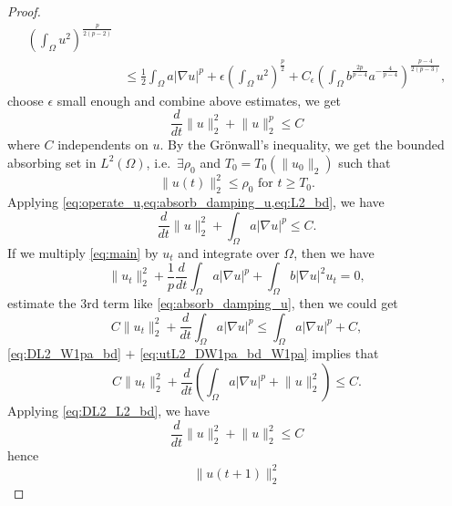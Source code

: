 \documentclass[11pt]{amsart}
\theoremstyle{definition}
\numberwithin{equation}{section}
\newcommand*\abs[1]{\lvert#1\rvert}
\newcommand*\norm[1]{\lVert#1\rVert}
\begin{document}
\begin{proof}
\begin{equation}
\begin{split}
			\left(\int_{\Omega}u^2\right)^{\frac{p}{2(p-2)}}\\
			&\leq \frac{1}{2}\int_{\Omega}a\abs{\nabla u}^p
			+ \epsilon \left(\int_{\Omega}u^2\right)^{\frac{p}{2}}
			+ C_{\epsilon}\left(\int_{\Omega}b^{\frac{2p}{p-4}}a^{-\frac{4}{p-4}}\right)^{\frac{p-4}{2(p-3)}},
		\end{split}
	\end{equation}
	choose $\epsilon$ small enough and combine above estimates, we get
	\begin{equation}\label{eq:DL2_L2_bd}
		\frac{d}{dt}\norm{u}_2^2 + \norm{u}_2^p \leq C
	\end{equation}
	where $C$ independents on $u$. By the Gr\"onwall's inequality, we get the
	bounded absorbing set in $L^2(\Omega)$, i.e.\ $\exists \rho_0$ and
	$T_0 = T_0(\norm{u_0}_2)$ such that
	\begin{equation}\label{eq:L2_bd}
		\norm{u(t)}_2^2 \leq \rho_0 \text{ for } t \geq T_0.
	\end{equation}
	Applying \cref{eq:operate_u,eq:absorb_damping_u,eq:L2_bd}, we have
	\begin{equation}\label{eq:DL2_W1pa_bd}
		\frac{d}{dt}\norm{u}_2^2 + \int_{\Omega}a \abs{\nabla u}^p \leq C.
	\end{equation}
	If we multiply \cref{eq:main} by $u_{t}$ and integrate over $\Omega$,
	then we have
	\begin{equation}\label{eq:operate_ut}
		\norm{u_t}_2^2
		+ \frac{1}{p}\frac{d}{dt}\int_{\Omega}a \abs{\nabla u}^p
		+ \int_{\Omega}b \abs{\nabla u}^2 u_t
		= 0,
	\end{equation}
	estimate the 3rd term like \cref{eq:absorb_damping_u}, then we could get
	\begin{equation}\label{eq:utL2_DW1pa_bd_W1pa}
		C\norm{u_t}_2^2
		+ \frac{d}{dt}\int_{\Omega}a \abs{\nabla u}^p
		\leq \int_{\Omega}a \abs{\nabla u}^p
		+ C,
	\end{equation}
	\cref{eq:DL2_W1pa_bd} $+$ \cref{eq:utL2_DW1pa_bd_W1pa} implies that
	\begin{equation}\label{eq:utL2_DW1pa_DL2}
		C\norm{u_t}_2^2
		+ \frac{d}{dt}\left(\int_{\Omega}a \abs{\nabla u}^p
		+ \norm{u}_2^2\right)
		\leq C.
	\end{equation}
	Applying \cref{eq:DL2_L2_bd}, we have
	\begin{equation}
		\frac{d}{dt}\norm{u}_2^2 + \norm{u}_2^2 \leq C
	\end{equation}
	hence
	\begin{equation}\label{eq:int_DL2_L2_bd}
		\norm{u(t+1)}_2^2

\end{equation}
\end{proof}
\end{document}

